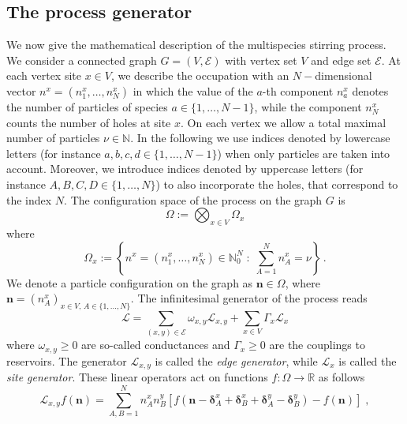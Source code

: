\documentclass[10pt]{article}
\numberwithin{equation}{section}
\numberwithin{equation}{subsection}
\newcommand{\co}{\;,}
\newcommand{\twoj}{\nu}
\begin{document}
\subsection{The process generator}\label{subsectionGeneratorStr}
We now give the mathematical description of the multispecies stirring process.
We consider a connected graph $G=(V,\mathcal{E})$ with vertex set $V$ and edge set $\mathcal{E}$.
At each vertex site $x\in V$, we describe the occupation with an $N-$dimensional vector $n^{x}=(n_{1}^{x},\ldots,n_{N}^{x})$ in which the value of the $a$-th component $n_{a}^{x}$ {denotes the number of particles of species $a\in \{1,\ldots,N-1\}$, while the component $n_{N}^{x}$ counts the number of holes at site $x$.} On each vertex we {allow a total maximal number of particles $\nu\in \mathbb{N}$}. {In the following we use indices denoted by lowercase letters (for instance $a,b,c,d\in \{1,\ldots,N-1\}$) when only particles are taken into account. Moreover, we introduce indices denoted by uppercase letters (for instance $A,B,C,D\in\{1,\ldots,N\}$)  to also incorporate the holes, that correspond to the index $N$. 
} 
The configuration space of the process on the graph $G$ is 
\begin{equation}\label{stateSpace}
    \Omega:=\bigotimes_{x\in V} \Omega_{x}
\end{equation}
where
\begin{equation}
\Omega_{x}:=\left\{n^x=(n_{1}^{x},\ldots,n_{N}^{x})\in\mathbb{N}_0^{N}\;:\; \sum_{A=1}^{N}n_{A}^{x}=\twoj\right\}\,.
\end{equation}
We denote a particle configuration on the graph as $\bm{n}\in \Omega$, where $\bm{n}=(n_{A}^{x})_{x\in V,\,A\in\{1,\ldots,N\}}$.
The infinitesimal generator of the process reads
\begin{equation}\label{Generator}
    \mathcal{L}=\sum_{(x,y)\in \mathcal{E}}\omega_{x,y}\mathcal{L}_{x,y}+\sum_{x\in V}\Gamma_{x}\mathcal{L}_{x}
\end{equation}
where  $ \omega_{x,y}\geq 0$ are so-called conductances and $\Gamma_{x}\geq 0$ are the couplings to reservoirs. 
The generator $\mathcal{L}_{x,y}$ is called the \textit{edge generator}, while $\mathcal{L}_{x}$ is called the \textit{site generator}. These linear operators act on functions $f:\Omega\to \mathbb{R}$ as follows
\begin{equation}\label{edgeGenerator}
\mathcal{L}_{x,y}f(\bm{n})=\sum_{A,B=1}^{N}n_{A}^{x}n_{B}^{y}\left[f(\bm{n}-\bm{\delta}^{x}_{A}+\bm{\delta}_{B}^{x}+\bm{\delta}_{A}^{y}-\bm{\delta}_{B}^{y})-f(\bm{n})\right]\co
\end{equation}
\end{document}

